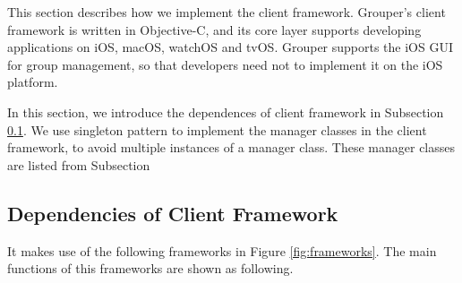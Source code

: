 \documentclass[a4paper,11pt]{report}
\begin{document}
This section describes how we implement the client framework.
Grouper's client framework is written in Objective-C, and its core layer supports developing applications on iOS, macOS, watchOS and tvOS.
Grouper supports the iOS GUI for group management, so that developers need not to implement it on the iOS platform.

In this section, we introduce the dependences of client framework in Subsection \ref{subsection:dependencies_client}.
We use singleton pattern to implement the manager classes in the client framework, to avoid multiple instances of a manager class.
These manager classes are listed from Subsection 

\subsection{Dependencies of Client Framework} \label{subsection:dependencies_client}

It makes use of the following frameworks in Figure \ref{fig:frameworks}.
The main functions of this frameworks are shown as following.
\end{document}
